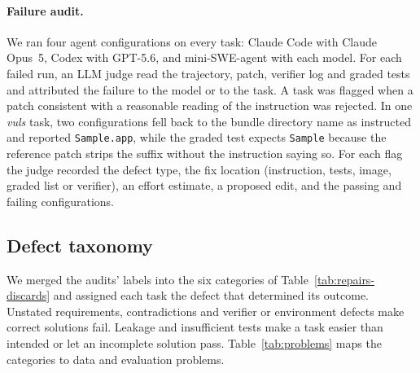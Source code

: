 \paragraph{Failure audit.}
We ran four agent configurations on every task: Claude Code with Claude Opus~5, Codex with GPT-5.6, and mini-SWE-agent with each model. For each failed run, an LLM judge read the trajectory, patch, verifier log and graded tests and attributed the failure to the model or to the task. A task was flagged when a patch consistent with a reasonable reading of the instruction was rejected. In one \textit{vuls} task, two configurations fell back to the bundle directory name as instructed and reported \texttt{Sample.app}, while the graded test expects \texttt{Sample} because the reference patch strips the suffix without the instruction saying so. For each flag the judge recorded the defect type, the fix location (instruction, tests, image, graded list or verifier), an effort estimate, a proposed edit, and the passing and failing configurations.

\subsection{Defect taxonomy}
\label{sec:taxonomy}

We merged the audits' labels into the six categories of Table~\ref{tab:repairs-discards} and assigned each task the defect that determined its outcome. Unstated requirements, contradictions and verifier or environment defects make correct solutions fail. Leakage and insufficient tests make a task easier than intended or let an incomplete solution pass. Table~\ref{tab:problems} maps the categories to data and evaluation problems.

